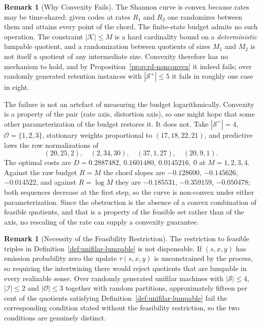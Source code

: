\documentclass[12pt]{article}
\theoremstyle{definition}
\newtheorem{remark}[theorem]{Remark}
\newcommand{\Splus}{\mathcal S^{+}}
\begin{document}
\begin{remark}[Why Convexity Fails]
\label{rem:rd-nonconvex-mechanism}
The Shannon curve is convex because rates may be time-shared: given codes at
rates $R_1$ and $R_2$ one randomizes between them and attains every point of
the chord.  The finite-state budget admits no such operation.  The constraint
$|\mathcal K|\le M$ is a hard cardinality bound on a \emph{deterministic}
lumpable quotient, and a randomization between quotients of sizes $M_1$ and
$M_2$ is not itself a quotient of any intermediate size.  Convexity therefore
has no mechanism to hold, and by
Proposition~\ref{prop:rd-nonconvex} it indeed fails; over randomly generated
retention instances with $|\Splus|\le5$ it fails in roughly one case in eight.

The failure is not an artefact of measuring the budget logarithmically.
Convexity is a property of the pair (rate axis, distortion axis), so one might
hope that some other parameterization of the budget restores it.  It does not.
Take $|\Splus|=4$, $\mathcal O=\{1,2,3\}$, stationary weights proportional to
$(17,18,22,21)$, and predictive laws the row normalizations of
\[
(20,25,2),\quad(2,34,30),\quad(37,1,27),\quad(20,9,1).
\]
The optimal costs are
$D=0.2887482,\ 0.1601480,\ 0.0145216,\ 0$ at $M=1,2,3,4$.  Against the raw
budget $R=M$ the chord slopes are $-0.128600$, $-0.145626$, $-0.014522$, and
against $R=\log M$ they are $-0.185531$, $-0.359159$, $-0.050478$; both
sequences decrease at the first step, so the curve is non-convex under either
parameterization.  Since the obstruction is the absence of a convex
combination of feasible quotients, and that is a property of the feasible set
rather than of the axis, no rescaling of the rate can supply a convexity
guarantee.
\end{remark}

\begin{remark}[Necessity of the Feasibility Restriction]
\label{rem:unifilar-feasibility}
The restriction to feasible triples in Definition~\ref{def:unifilar-lumpable}
is not dispensable.  If
$(s,x,y)$ has emission probability zero the update $\tau(s,x,y)$ is
unconstrained by the process, so requiring the intertwining there would reject
quotients that are lumpable in every realizable sense.  Over randomly generated unifilar machines with $|\mathcal S|\le4$,
$|\mathcal I|\le2$ and $|\mathcal O|\le3$ together with random partitions,
approximately fifteen per cent of the quotients satisfying
Definition~\ref{def:unifilar-lumpable} fail the corresponding condition stated
without the feasibility restriction, so the two conditions are genuinely
distinct.
\end{remark}
\end{document}
